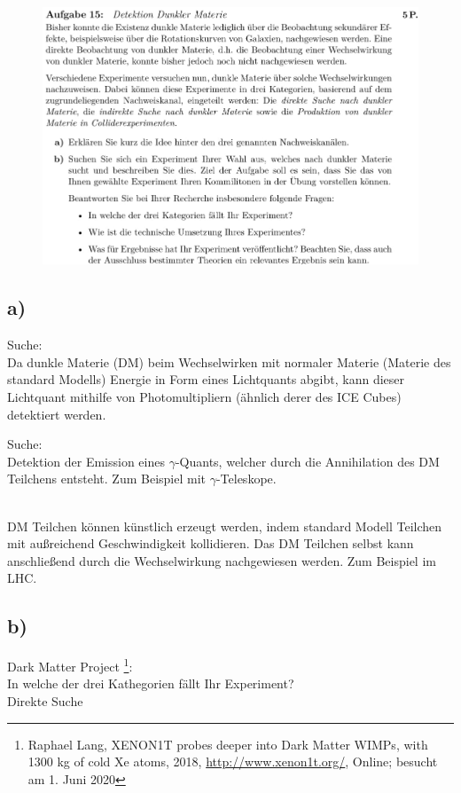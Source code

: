     \begin{figure}[H]
        \centering
        \includegraphics[width=\textwidth]{images/Aufgabe15.jpg}
        \label{fig:4}
    \end{figure}

\subsection{a)}

    \justifying Suche:\\
    Da dunkle Materie (DM) beim Wechselwirken mit normaler Materie (Materie des standard Modells) Energie in Form eines Lichtquants abgibt, kann dieser Lichtquant
    mithilfe von Photomultipliern (ähnlich derer des ICE Cubes) detektiert werden.

    \justifying Suche:\\
    Detektion der Emission eines $\gamma$-Quants, welcher durch die Annihilation des DM Teilchens entsteht. Zum Beispiel mit $\gamma$-Teleskope.

    \justifying\\
    DM Teilchen können künstlich erzeugt werden, indem standard Modell Teilchen mit außreichend Geschwindigkeit kollidieren. Das DM Teilchen selbst kann anschließend
    durch die Wechselwirkung nachgewiesen werden. Zum Beispiel im LHC.

\subsection{b)}

    \justifying Dark Matter Project \footnote{Raphael Lang, XENON1T probes deeper into Dark Matter WIMPs, with 1300 kg of cold Xe atoms, 
    2018, \url{http://www.xenon1t.org/}, Online; besucht am 1. Juni 2020}:\\
    In welche der drei Kathegorien fällt Ihr Experiment?\\
    Direkte Suche

